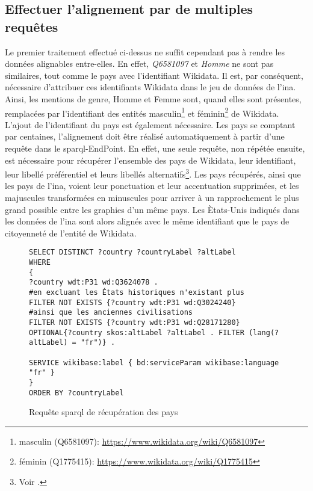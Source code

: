 \subsection{\label{II-C-2-c}Effectuer l'alignement par de multiples requêtes}

Le premier traitement effectué ci-dessus ne suffit cependant pas à rendre les données alignables entre-elles. En effet, \textit{Q6581097} et \textit{Homme} ne sont pas similaires, tout comme le pays avec l'identifiant Wikidata. Il est, par conséquent, nécessaire d'attribuer ces identifiants Wikidata dans le jeu de données de l'\ac{ina}. Ainsi, les mentions de genre, \og Homme\fg{} et \og Femme\fg{} sont, quand elles sont présentes, remplacées par l'identifiant des entités \og masculin\fg{}\footnote{masculin (Q6581097): \url{https://www.wikidata.org/wiki/Q6581097}} et \og féminin\fg{}\footnote{féminin (Q1775415): \url{https://www.wikidata.org/wiki/Q1775415}} de Wikidata.\\

L'ajout de l'identifiant du pays est également nécessaire. Les pays se comptant par centaines, l'alignement doit être réalisé automatiquement à partir d'une requête dans le \ac{sparql}-EndPoint. En effet, une seule requête, non répétée ensuite, est nécessaire pour récupérer l'ensemble des pays de Wikidata, leur identifiant, leur libellé préférentiel et leurs libellés alternatifs\footnote{Voir .}. Les pays récupérés, ainsi que les pays de l'\ac{ina}, voient leur ponctuation et leur accentuation supprimées, et les majuscules transformées en minuscules pour arriver à un rapprochement le plus grand possible entre les graphies d'un même pays. Les Ètats-Unis indiqués dans les données de l'\ac{ina} sont alors alignés avec le même identifiant que le pays de citoyenneté de l'entité  de Wikidata.

\begin{figure}[!h]
	\centering
\begin{verbatim}
SELECT DISTINCT ?country ?countryLabel ?altLabel
WHERE
{
?country wdt:P31 wd:Q3624078 .
#en excluant les États historiques n'existant plus
FILTER NOT EXISTS {?country wdt:P31 wd:Q3024240}
#ainsi que les anciennes civilisations
FILTER NOT EXISTS {?country wdt:P31 wd:Q28171280}
OPTIONAL{?country skos:altLabel ?altLabel . FILTER (lang(?altLabel) = "fr")} .
		
SERVICE wikibase:label { bd:serviceParam wikibase:language "fr" }
}
ORDER BY ?countryLabel
\end{verbatim}
\caption{Requête \ac{sparql} de récupération des pays}
\label{sparql_pays}
\end{figure}


